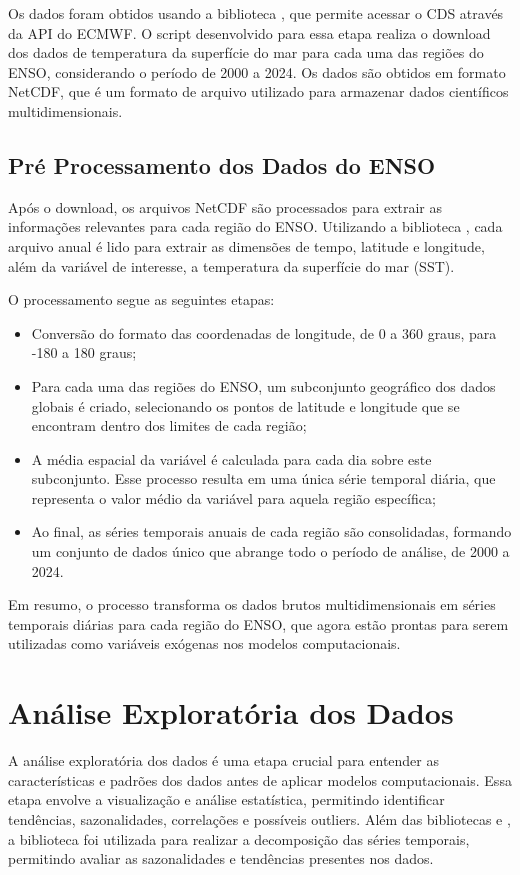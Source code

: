 Os dados foram obtidos usando a biblioteca , que permite acessar o CDS através da
API do ECMWF. O script desenvolvido para essa etapa realiza o download dos dados de temperatura da superfície do mar
para cada uma das regiões do ENSO, considerando o período de 2000 a 2024. Os dados são obtidos em formato NetCDF, que é 
um formato de arquivo utilizado para armazenar dados científicos multidimensionais.

\subsection{Pré Processamento dos Dados do ENSO} %
Após o download, os arquivos NetCDF são processados para extrair as informações relevantes para cada região do ENSO. 
Utilizando a biblioteca , cada arquivo anual é lido para extrair as dimensões de tempo, latitude e longitude, 
além da variável de interesse, a temperatura da superfície do mar (SST).

O processamento segue as seguintes etapas:
\begin{itemize}
\item Conversão do formato das coordenadas de longitude, de 0 a 360 graus, para -180 a 180 graus;
\item Para cada uma das regiões do ENSO, um subconjunto geográfico dos dados globais é criado, selecionando os pontos
de latitude e longitude que se encontram dentro dos limites de cada região;
\item A média espacial da variável é calculada para cada dia sobre este subconjunto. Esse processo resulta em uma única série
temporal diária, que representa o valor médio da variável para aquela região específica;
\item Ao final, as séries temporais anuais de cada região são consolidadas, formando um conjunto de dados único que abrange
todo o período de análise, de 2000 a 2024.
\end{itemize}

Em resumo, o processo transforma os dados brutos multidimensionais em séries temporais diárias para cada região
do ENSO, que agora estão prontas para serem utilizadas como variáveis exógenas nos modelos computacionais.


\section{Análise Exploratória dos Dados} %
A análise exploratória dos dados é uma etapa crucial para entender as características e padrões dos dados antes de aplicar modelos computacionais.
Essa etapa envolve a visualização e análise estatística, permitindo identificar tendências, sazonalidades, correlações e possíveis outliers. 
Além das bibliotecas  e , a biblioteca  foi utilizada para realizar a decomposição
das séries temporais, permitindo avaliar as sazonalidades e tendências presentes nos dados.

